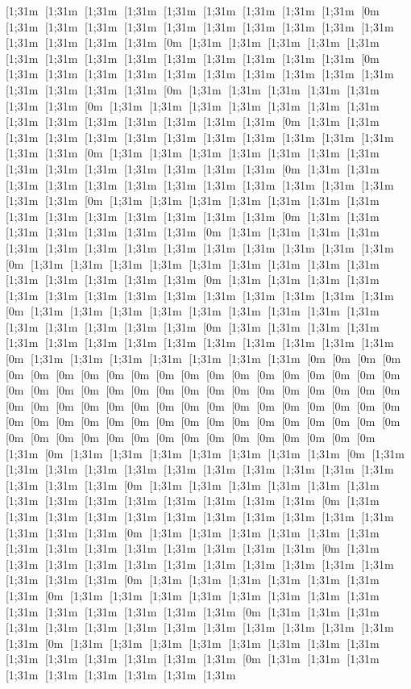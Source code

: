 [1;31m [1;31m [1;31m [1;31m [1;31m [1;31m [1;31m [1;31m [1;31m [0m [1;31m [1;31m [1;31m [1;31m [1;31m [1;31m [1;31m [1;31m [1;31m [1;31m [1;31m [1;31m [1;31m [1;31m [0m [1;31m [1;31m [1;31m [1;31m [1;31m [1;31m [1;31m [1;31m [1;31m [1;31m [1;31m [1;31m [1;31m [1;31m [0m [1;31m [1;31m [1;31m [1;31m [1;31m [1;31m [1;31m [1;31m [1;31m [1;31m [1;31m [1;31m [1;31m [1;31m [0m [1;31m [1;31m [1;31m [1;31m [1;31m [1;31m [1;31m [0m [1;31m [1;31m [1;31m [1;31m [1;31m [1;31m [1;31m [1;31m [1;31m [1;31m [1;31m [1;31m [1;31m [1;31m [0m [1;31m [1;31m [1;31m [1;31m [1;31m [1;31m [1;31m [1;31m [1;31m [1;31m [1;31m [1;31m [1;31m [1;31m [0m [1;31m [1;31m [1;31m [1;31m [1;31m [1;31m [1;31m [1;31m [1;31m [1;31m [1;31m [1;31m [1;31m [1;31m [0m [1;31m [1;31m [1;31m [1;31m [1;31m [1;31m [1;31m [1;31m [1;31m [1;31m [1;31m [1;31m [1;31m [1;31m [0m [1;31m [1;31m [1;31m [1;31m [1;31m [1;31m [1;31m [1;31m [1;31m [1;31m [1;31m [1;31m [1;31m [1;31m [0m [1;31m [1;31m [1;31m [1;31m [1;31m [1;31m [1;31m [0m [1;31m [1;31m [1;31m [1;31m [1;31m [1;31m [1;31m [1;31m [1;31m [1;31m [1;31m [1;31m [1;31m [1;31m [0m [1;31m [1;31m [1;31m [1;31m [1;31m [1;31m [1;31m [1;31m [1;31m [1;31m [1;31m [1;31m [1;31m [1;31m [0m [1;31m [1;31m [1;31m [1;31m [1;31m [1;31m [1;31m [1;31m [1;31m [1;31m [1;31m [1;31m [1;31m [1;31m [0m [1;31m [1;31m [1;31m [1;31m [1;31m [1;31m [1;31m [1;31m [1;31m [1;31m [1;31m [1;31m [1;31m [1;31m [0m [1;31m [1;31m [1;31m [1;31m [1;31m [1;31m [1;31m [1;31m [1;31m [1;31m [1;31m [1;31m [1;31m [1;31m [0m [1;31m [1;31m [1;31m [1;31m [1;31m [1;31m [1;31m [0m [0m [0m [0m [0m [0m [0m [0m [0m [0m [0m [0m [0m [0m [0m [0m [0m [0m [0m [0m [0m [0m [0m [0m [0m [0m [0m [0m [0m [0m [0m [0m [0m [0m [0m [0m [0m [0m [0m [0m [0m [0m [0m [0m [0m [0m [0m [0m [0m [0m [0m [0m [0m [0m [0m [0m [0m [0m [0m [0m [0m [0m [0m [0m [0m [0m [0m [0m [0m [0m [0m [0m [0m [0m [0m [0m [0m [0m [0m [0m [0m [0m [0m [1;31m [0m [1;31m [1;31m [1;31m [1;31m [1;31m [1;31m [1;31m [0m [1;31m [1;31m [1;31m [1;31m [1;31m [1;31m [1;31m [1;31m [1;31m [1;31m [1;31m [1;31m [1;31m [1;31m [0m [1;31m [1;31m [1;31m [1;31m [1;31m [1;31m [1;31m [1;31m [1;31m [1;31m [1;31m [1;31m [1;31m [1;31m [0m [1;31m [1;31m [1;31m [1;31m [1;31m [1;31m [1;31m [1;31m [1;31m [1;31m [1;31m [1;31m [1;31m [1;31m [0m [1;31m [1;31m [1;31m [1;31m [1;31m [1;31m [1;31m [1;31m [1;31m [1;31m [1;31m [1;31m [1;31m [1;31m [0m [1;31m [1;31m [1;31m [1;31m [1;31m [1;31m [1;31m [1;31m [1;31m [1;31m [1;31m [1;31m [1;31m [1;31m [0m [1;31m [1;31m [1;31m [1;31m [1;31m [1;31m [1;31m [0m [1;31m [1;31m [1;31m [1;31m [1;31m [1;31m [1;31m [1;31m [1;31m [1;31m [1;31m [1;31m [1;31m [1;31m [0m [1;31m [1;31m [1;31m [1;31m [1;31m [1;31m [1;31m [1;31m [1;31m [1;31m [1;31m [1;31m [1;31m [1;31m [0m [1;31m [1;31m [1;31m [1;31m [1;31m [1;31m [1;31m [1;31m [1;31m [1;31m [1;31m [1;31m [1;31m [1;31m [0m [1;31m [1;31m [1;31m [1;31m [1;31m [1;31m [1;31m [1;31m [1;31m 